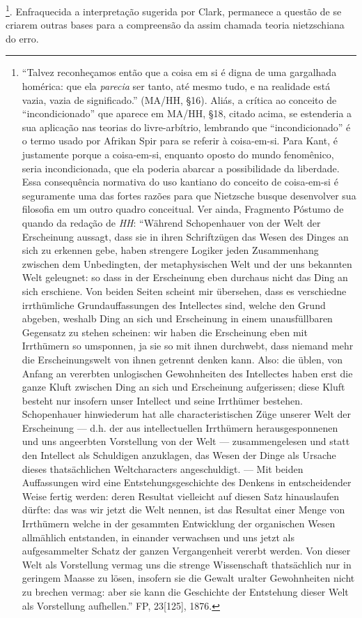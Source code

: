 \documentclass[
	12pt,				%
	openright,			%
	oneside,			%
	a4paper,			%
	english,			%
	french,				%
	spanish,			%
	brazil				%
	]{abntex2}
\begin{document}
\footnote{“Talvez reconheçamos então que a coisa em si é digna de uma gargalhada homérica: que ela \textit{parecia} ser tanto, até mesmo tudo, e na realidade está vazia, vazia de significado.” (MA/HH, §16). Aliás, a crítica ao conceito de “incondicionado” que aparece em MA/HH, §18, citado acima, se estenderia a sua aplicação nas teorias do livre-arbítrio, lembrando que “incondicionado” é o termo usado por Afrikan Spir para se referir à coisa-em-si. Para Kant, é justamente porque a coisa-em-si, enquanto oposto do mundo fenomênico, seria incondicionada, que ela poderia abarcar a possibilidade da liberdade. Essa consequência normativa do uso kantiano do conceito de coisa-em-si é seguramente uma das fortes razões para que Nietzsche busque desenvolver sua filosofia em um outro quadro conceitual. Ver ainda, Fragmento Póstumo de quando da redação de \textit{HH}: “Während Schopenhauer von der Welt der Erscheinung aussagt, dass sie in ihren Schriftzügen das Wesen des Dinges an sich zu erkennen gebe, haben strengere Logiker jeden Zusammenhang zwischen dem Unbedingten, der metaphysischen Welt und der uns bekannten Welt geleugnet: so dass in der Erscheinung eben durchaus nicht das Ding an sich erschiene. Von beiden Seiten scheint mir übersehen, dass es verschiedne irrthümliche Grundauffassungen des Intellectes sind, welche den Grund abgeben, weshalb Ding an sich und Erscheinung in einem unausfüllbaren Gegensatz zu stehen scheinen: wir haben die Erscheinung eben mit Irrthümern so umsponnen, ja sie so mit ihnen durchwebt, dass niemand mehr die Erscheinungswelt von ihnen getrennt denken kann. Also: die üblen, von Anfang an vererbten unlogischen Gewohnheiten des Intellectes haben erst die ganze Kluft zwischen Ding an sich und Erscheinung aufgerissen; diese Kluft besteht nur insofern unser Intellect und seine Irrthümer bestehen. Schopenhauer hinwiederum hat alle characteristischen Züge unserer Welt der Erscheinung — d.h. der aus intellectuellen Irrthümern herausgesponnenen und uns angeerbten Vorstellung von der Welt — zusammengelesen und statt den Intellect als Schuldigen anzuklagen, das Wesen der Dinge als Ursache dieses thatsächlichen Weltcharacters angeschuldigt. — Mit beiden Auffassungen wird eine Entstehungsgeschichte des Denkens in entscheidender Weise fertig werden: deren Resultat vielleicht auf diesen Satz hinauslaufen dürfte: das was wir jetzt die Welt nennen, ist das Resultat einer Menge von Irrthümern welche in der gesammten Entwicklung der organischen Wesen allmählich entstanden, in einander verwachsen und uns jetzt als aufgesammelter Schatz der ganzen Vergangenheit vererbt werden. Von dieser Welt als Vorstellung vermag uns die strenge Wissenschaft thatsächlich nur in geringem Maasse zu lösen, insofern sie die Gewalt uralter Gewohnheiten nicht zu brechen vermag: aber sie kann die Geschichte der Entstehung dieser Welt als Vorstellung aufhellen.” FP, 23[125], 1876.}.
Enfraquecida a interpretação sugerida por Clark, permanece a questão de se criarem outras bases para a compreensão da assim chamada teoria nietzschiana do erro.
\end{document}
